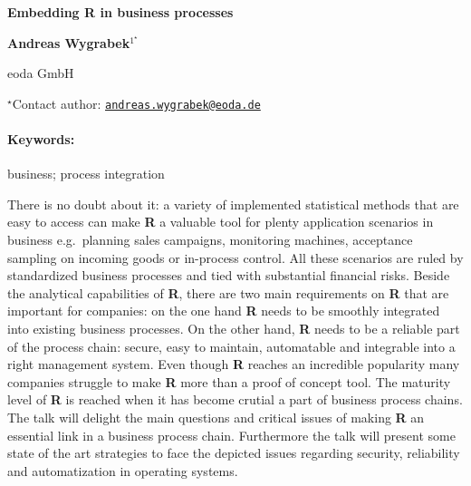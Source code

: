 \documentclass[11pt, a4paper]{article}
\renewcommand{\title}[1]{\begin{center}{\bf \LARGE #1}\end{center}}
\newcommand{\keywords}{\paragraph{Keywords:}}
\begin{document}
\pagestyle{empty}

\title{Embedding R in business processes}

\begin{center}
  {\bf Andreas Wygrabek$^{1^\star}$}
\end{center}

\vskip 0.3cm

\begin{affiliations}
\begin{enumerate}
\begin{minipage}{0.915\textwidth}
\centering
\item eoda GmbH \\[-2pt]
\end{minipage}
\end{enumerate}
$^\star$Contact author: \href{mailto:andreas.wygrabek@eoda.de}{\nolinkurl{andreas.wygrabek@eoda.de}}\\
\end{affiliations}

\vskip 0.5cm

\begin{minipage}{0.915\textwidth}
\keywords business; process integration
\end{minipage}

\vskip 0.8cm

There is no doubt about it: a variety of implemented statistical methods
that are easy to access can make \textbf{R} a valuable tool for plenty
application scenarios in business e.g.~planning sales campaigns,
monitoring machines, acceptance sampling on incoming goods or in-process
control. All these scenarios are ruled by standardized business
processes and tied with substantial financial risks. Beside the
analytical capabilities of \textbf{R}, there are two main requirements
on \textbf{R} that are important for companies: on the one hand
\textbf{R} needs to be smoothly integrated into existing business
processes. On the other hand, \textbf{R} needs to be a reliable part of
the process chain: secure, easy to maintain, automatable and integrable
into a right management system. Even though \textbf{R} reaches an
incredible popularity many companies struggle to make \textbf{R} more
than a proof of concept tool. The maturity level of \textbf{R} is
reached when it has become crutial a part of business process chains.
The talk will delight the main questions and critical issues of making
\textbf{R} an essential link in a business process chain. Furthermore
the talk will present some state of the art strategies to face the
depicted issues regarding security, reliability and automatization in
operating systems.
\end{document}
